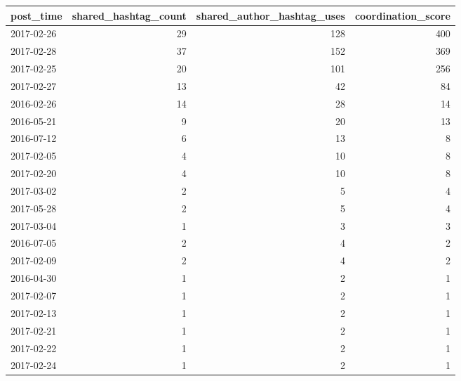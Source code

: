 \begin{tabular}{lrrr}
\toprule
post\_time & shared\_hashtag\_count & shared\_author\_hashtag\_uses & coordination\_score \\
\midrule
2017-02-26 & 29 & 128 & 400 \\
2017-02-28 & 37 & 152 & 369 \\
2017-02-25 & 20 & 101 & 256 \\
2017-02-27 & 13 & 42 & 84 \\
2016-02-26 & 14 & 28 & 14 \\
2016-05-21 & 9 & 20 & 13 \\
2016-07-12 & 6 & 13 & 8 \\
2017-02-05 & 4 & 10 & 8 \\
2017-02-20 & 4 & 10 & 8 \\
2017-03-02 & 2 & 5 & 4 \\
2017-05-28 & 2 & 5 & 4 \\
2017-03-04 & 1 & 3 & 3 \\
2016-07-05 & 2 & 4 & 2 \\
2017-02-09 & 2 & 4 & 2 \\
2016-04-30 & 1 & 2 & 1 \\
2017-02-07 & 1 & 2 & 1 \\
2017-02-13 & 1 & 2 & 1 \\
2017-02-21 & 1 & 2 & 1 \\
2017-02-22 & 1 & 2 & 1 \\
2017-02-24 & 1 & 2 & 1 \\
\bottomrule
\end{tabular}
